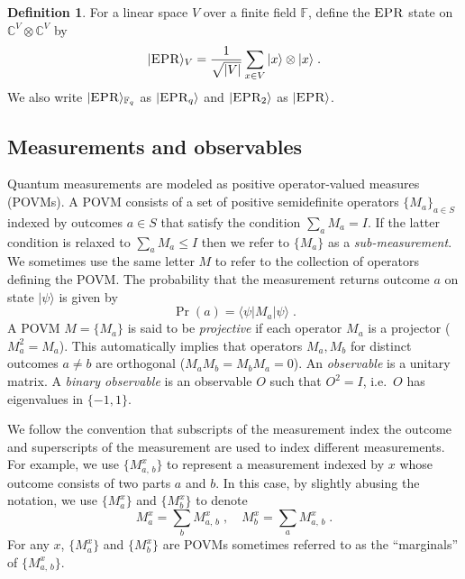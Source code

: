 \documentclass[11pt]{article}
\theoremstyle{definition}
\newtheorem{definition}[theorem]{Definition}
\newcommand{\ket}[1]{|#1\rangle}
\newcommand{\bra}[1]{\langle#1|}
\newcommand{\Id}{\ensuremath{I}}
\newcommand{\C}{\ensuremath{\mathbb{C}}}
\newcommand{\F}{\ensuremath{\mathbb{F}}}
\newcommand{\abs}[1]{\left\vert {#1} \right\vert}
\newcommand{\labelstyle}[1]{\ensuremath{\textsc{#1}}\xspace}
\newcommand{\EPR}{\labelstyle{EPR}}
\begin{document}
\begin{definition}
  \label{def:EPR}
  For a linear space $V$ over a finite field $\F$, define the \EPR state on $\C^V
  \otimes \C^V$ by
  \begin{equation*}
    \ket{\EPR}_V = \frac{1}{\sqrt{\abs{V}}} \sum_{x\in V}\ket {x}\otimes \ket{x}\;.
  \end{equation*}
  We also write $\ket{\EPR}_{\F_q}$ as $\ket{\EPR_q}$ and $\ket{\EPR_2}$ as
  $\ket{\EPR}$.
\end{definition}

\subsection{Measurements and observables}

Quantum measurements are modeled as positive operator-valued
measures (POVMs).
A POVM consists of a set of positive semidefinite operators $\{ M_a \}_{a\in S}$
indexed by outcomes $a\in S$ that satisfy the condition $\sum_a M_a = I$. If the latter condition is relaxed to $\sum_a M_a \leq I$ then we refer to $\{M_a\}$ as a \emph{sub-measurement}.
We sometimes use the same letter $M$ to refer to the collection of operators
defining the POVM.
The probability that the measurement returns outcome $a$ on state $\ket{\psi}$
is given by
\begin{equation*}
  \Pr(a) = \bra{\psi} M_a \ket{\psi}\;.
\end{equation*}
A POVM $M=\{M_a\}$ is said to be \emph{projective} if each operator $M_a$ is a
projector ($M_a^2 = M_a$). This automatically implies that operators
$M_a, M_b$ for distinct outcomes $a \neq b$ are orthogonal ($M_a M_b =
M_b M_a = 0$). An \emph{observable} is a unitary matrix.
A \emph{binary observable} is an observable $O$ such that $O^2 = \Id$, i.e.\ $O$
has eigenvalues in $\{-1,1\}$.

We follow the convention that subscripts of the measurement index
the outcome and superscripts of the measurement are used to index different
measurements.
For example, we use $\{M^x_{a,\, b}\}$ to represent a measurement indexed by $x$
whose outcome consists of two parts $a$ and $b$.
In this case, by slightly abusing the notation, we use $\{M^x_a\}$ and $\{M^x_b\}$
to denote
\begin{equation*}
  M^x_a = \sum_b M^x_{a,\, b}\;, \quad M^x_b = \sum_a M^x_{a,\, b}\;.
\end{equation*}
For any $x$, $\{M^x_a\}$ and $\{M^x_b\}$ are POVMs sometimes referred to as the
``marginals'' of $\{M^x_{a,\, b}\}$.
\end{document}
